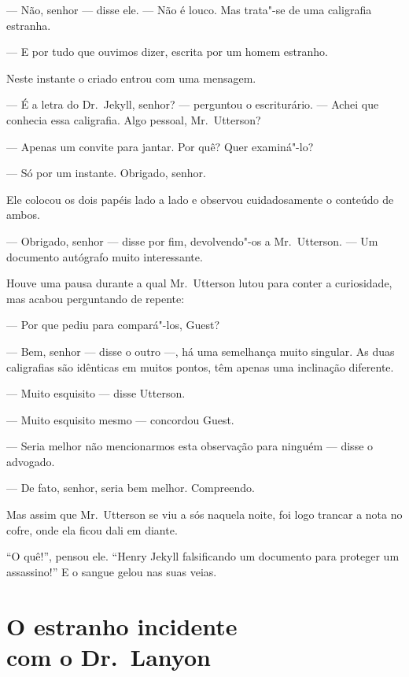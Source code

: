 --- Não, senhor --- disse ele. --- Não é louco.  Mas trata"-se de uma
caligrafia estranha.

--- E por tudo que ouvimos dizer, escrita por um homem estranho.

Neste instante o criado entrou com uma mensagem.

--- É a letra do Dr.~Jekyll, senhor? --- perguntou o escriturário. --- Achei
que conhecia essa caligrafia.  Algo pessoal, Mr.~Utterson?

--- Apenas um convite para jantar.  Por quê?  Quer examiná"-lo?

--- Só por um instante.  Obrigado, senhor.

Ele colocou os dois papéis lado a lado e observou cuidadosamente o
conteúdo de ambos.

--- Obrigado, senhor --- disse por fim, devolvendo"-os a Mr.~Utterson. --- Um
documento autógrafo muito interessante.

Houve uma pausa durante a qual Mr.~Utterson lutou para conter a
curiosidade, mas acabou perguntando de repente:

--- Por que pediu para compará"-los, Guest?

--- Bem, senhor --- disse o outro ---, há uma semelhança muito singular.  As
duas caligrafias são idênticas em muitos pontos, têm apenas uma
inclinação diferente.

--- Muito esquisito --- disse Utterson.

--- Muito esquisito mesmo --- concordou Guest.

--- Seria melhor não mencionarmos esta observação para ninguém --- disse o
advogado.

--- De fato, senhor, seria bem melhor.  Compreendo.

Mas assim que Mr.~Utterson se viu a sós naquela noite, foi logo trancar
a nota no cofre, onde ela ficou dali em diante.

“O quê!”, pensou ele.  “Henry Jekyll falsificando um documento para
proteger um assassino!”  E o sangue gelou nas suas veias. 


\chapter[O estranho incidente com o Dr.~Lanyon]{O estranho incidente\\ com o Dr.~Lanyon}

